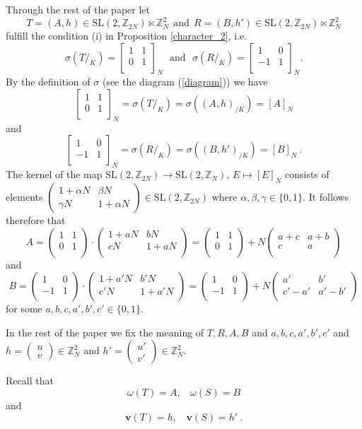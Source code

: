 \documentclass[10pt]{amsart}
\theoremstyle{plain}
\theoremstyle{definition}
\theoremstyle{remark}%
\newcommand{\Z}{\mathbb{Z}}
\newcommand{\f}{\mathbf{v}}
\newcommand{\g}{\omega}
\newcommand{\SL}{\mathrm{SL}}
\newcommand{\mat}[4]{\left(\begin{array}{cc}
 #1 & #2\\
 #3 & #4\\
\end{array}\right)}
\newcommand{\matN}[4]{\left[\begin{array}{cc}
 #1 & #2\\
 #3 & #4\\
\end{array}\right]_N}
\begin{document}

Through the rest of the paper let $$T=(A,h)\in \SL(2,\Z_{2N})\ltimes \Z_{N}^2\ \ \text{and} \  \
 R=(B,h')\in \SL(2,\Z_{2N})\ltimes \Z_{N}^2$$ fulfill the condition (i) in Proposition \ref{character_2}, i.e. 
$$\sigma(T/_{K})=\matN{1}{1}{0}{1}\ \ \ \text{and} \ \ \ \sigma(R/_{K})=\matN{1}{0}{-1}{1} .
$$
By the definition of $\sigma$ (see the diagram (\ref{diagram})) we have
$$\matN{1}{1}{0}{1} =\sigma(T/_{K})=\sigma\left((A,h)_{/K}\right)=[A]_{N}$$
and $$\matN{1}{0}{-1}{1} =\sigma(R/_{K})=\sigma\left((B,h')_{/K}\right)=[B]_{N}\ .$$
The kernel of the map $\SL(2,\Z_{2N})\to \SL(2,\Z_{N})$, $E\mapsto[E]_N$ consists of elements $\left(\begin{smallmatrix}1+\alpha N & \beta N\\ \gamma N & 1+\alpha N\end{smallmatrix}\right)\in \SL(2,\Z_{2N})$ where $\alpha,\beta,\gamma\in\{0,1\}$. It follows therefore that
$$A=\mat{1}{1}{0}{1}\cdot\mat{1+aN}{bN}{cN}{1+aN}=\mat{1}{1}{0}{1}+N\mat{a+c}{a+b}{c}{a}$$
and 
$$B=\mat{1}{0}{-1}{1}\cdot\mat{1+a'N}{b'N}{c'N}{1+a'N}=\mat{1}{0}{-1}{1}+N\mat{a'}{b'}{c'-a'}{a'-b'}$$
for some $a,b,c,a',b',c'\in\{0,1\}$.

In the rest of the paper  we fix the meaning of $T,R, A, B$ and $a,b,c,a',b',c'$ and $h=\left(\begin{smallmatrix}u\\v\end{smallmatrix}\right)\in\Z_N^2$ and $h'=\left(\begin{smallmatrix}u'\\v'\end{smallmatrix}\right)\in\Z_N^2$.

Recall that $$\g(T)=A, \ \ \ \ \g(S)=B $$
and $$\f(T)=h, \ \ \ \ \f(S)=h' \ .$$



\





\end{document}
